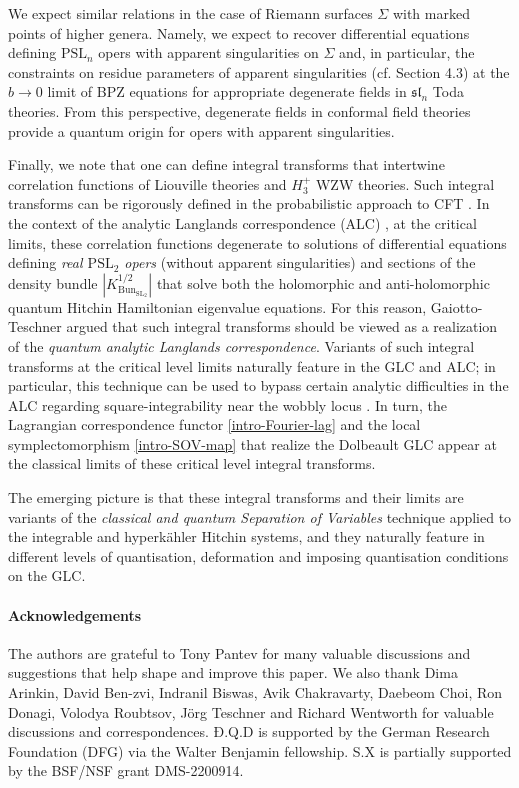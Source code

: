 \documentclass[twoside, 11pt]{article}
\numberwithin{equation}{section}
\theoremstyle{theorem}
\numberwithin{theorem}{section}
\theoremstyle{definition}
\begin{document}
We expect similar relations in the case of Riemann surfaces $\Sigma$ with marked points of higher genera. Namely, we expect to recover differential equations defining $\mathrm{PSL}_n$ opers with apparent singularities on $\Sigma$ and, in particular, the constraints on residue parameters of apparent singularities (cf. Section 4.3) at the $b \rightarrow 0$ limit of BPZ equations for appropriate degenerate fields in $\mathfrak{sl}_n$ Toda theories. From this perspective, degenerate fields in conformal field theories provide a quantum origin for opers with apparent singularities. 

Finally, we note that one can define integral transforms that intertwine correlation functions of Liouville theories and $H_3^+$ WZW theories. Such integral transforms can be rigorously defined in the probabilistic approach to CFT \cite{GKR25}. In the context of the analytic Langlands correspondence (ALC) \cite{Teschner2018, EFK2021, EFK2022, EFK2023, AT25}, at the critical limits, these correlation functions degenerate to solutions of differential equations defining \textit{real $\mathrm{PSL}_2$ opers} (without apparent singularities) and sections of the density bundle $|K^{1/2}_{\mathrm{Bun}_{\mathrm{SL}_2}}|$ that solve both the holomorphic and anti-holomorphic quantum Hitchin Hamiltonian eigenvalue equations.
For this reason, Gaiotto-Teschner \cite{GT24} 
argued that such integral transforms should be viewed as a realization of the \textit{quantum analytic Langlands correspondence}. 
Variants of such integral transforms at the critical level limits naturally feature in the GLC \cite{Frenkel1995} and ALC; 
in particular, this technique can be used to bypass certain analytic difficulties in the ALC regarding square-integrability near the wobbly locus \cite{AT25, AADT}. In turn, the Lagrangian correspondence functor \eqref{intro-Fourier-lag} and the local symplectomorphism \eqref{intro-SOV-map} that realize the Dolbeault GLC appear at the classical limits of these critical level integral transforms. 

The emerging picture is that these integral transforms and their limits are variants of the \textit{classical and quantum Separation of Variables} technique applied to the integrable and hyperk\"{a}hler Hitchin systems, and they naturally feature in different levels of quantisation, deformation and imposing quantisation conditions on the GLC.



\paragraph{Acknowledgements} The authors are grateful to Tony Pantev for many valuable discussions and suggestions that help shape and improve this paper. We also thank Dima Arinkin, David Ben-zvi, Indranil Biswas, Avik Chakravarty, Daebeom Choi, Ron Donagi, Volodya Roubtsov, J\"org Teschner and Richard Wentworth for valuable discussions and correspondences. 
Đ.Q.D is supported by the German Research Foundation (DFG) via the Walter Benjamin fellowship. 
S.X is partially supported by the BSF/NSF grant DMS-2200914.
\end{document}
